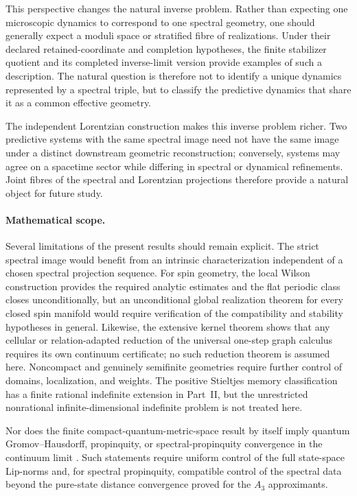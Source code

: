 \documentclass[11pt]{article}
\theoremstyle{definition}
\theoremstyle{remark}
\theoremstyle{definition}
\theoremstyle{remark}
\begin{document}
This perspective changes the natural inverse problem.  Rather than expecting one
microscopic dynamics to correspond to one spectral geometry, one should generally
expect a moduli space or stratified fibre of realizations.  Under their declared retained-coordinate and completion hypotheses, the
finite stabilizer quotient and its completed inverse-limit version provide
examples of such a description.  The
natural question is therefore not to identify a unique dynamics represented by a
spectral triple, but to classify the predictive dynamics that share it as a common
effective geometry.

The independent Lorentzian construction
\cite{PelissierRenewalSpacetime2026} makes this inverse problem richer.  Two
predictive systems with the same spectral image need not have the same image under
a distinct downstream geometric reconstruction; conversely, systems may agree on
a spacetime sector while differing in spectral or dynamical refinements.  Joint
fibres of the spectral and Lorentzian projections therefore provide a natural
object for future study.

\paragraph{Mathematical scope.}

Several limitations of the present results should remain explicit.  The strict
spectral image would benefit from an intrinsic characterization independent of a
chosen spectral projection sequence.  For spin geometry, the local Wilson
construction provides the required analytic estimates and the flat periodic class
closes unconditionally, but an unconditional global realization theorem for every
closed spin manifold would require verification of the compatibility and stability
hypotheses in general.  Likewise, the extensive kernel theorem shows that any
cellular or relation-adapted reduction of the universal one-step graph calculus
requires its own continuum certificate; no such reduction theorem is assumed here.  Noncompact and genuinely
semifinite geometries require further control of domains, localization, and
weights.  The positive Stieltjes memory classification has a finite
rational indefinite extension in Part~II, but the unrestricted nonrational
infinite-dimensional indefinite problem is not treated here.

Nor does the finite compact-quantum-metric-space result by itself imply
quantum Gromov--Hausdorff, propinquity, or spectral-propinquity convergence in the
continuum limit \cite{Rieffel2004,Latremoliere2022,FarsiLatremolierePacker2024}.
Such statements require uniform control of the full state-space Lip-norms and, for
spectral propinquity, compatible control of the spectral data beyond the
pure-state distance convergence proved for the $A_3$ approximants.
\end{document}
